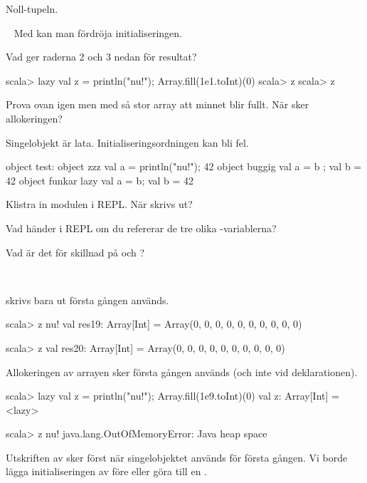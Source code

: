 \SubtaskSolved Noll-tupeln.

\QUESTEND



\QUESTBEGIN

\Task \what~ Med  kan man fördröja initialiseringen.

\Subtask Vad ger raderna 2 och 3 nedan för resultat?
\begin{REPL}
scala> lazy val z = { println("nu!"); Array.fill(1e1.toInt)(0)}
scala> z
scala> z
\end{REPL}

\Subtask Prova ovan igen men med så stor array att minnet blir fullt. När sker allokeringen?

\Subtask Singelobjekt är lata. Initialiseringsordningen kan bli fel.
\begin{Code}
object test:
  object zzz    { val a = { println("nu!"); 42} }
  object buggig { val a = b ; val b = 42        }
  object funkar { lazy val a = b; val b = 42    }
\end{Code}
\noindent Klistra in modulen  i REPL. När skrivs  ut?

\Subtask Vad händer i REPL om du refererar de tre olika -variablerna?

\Subtask Vad är det för skillnad på  och ?

\SOLUTION

\TaskSolved \what~

\SubtaskSolved {} skrivs bara ut första gången  används.
\begin{REPL}
scala> z
nu!
val res19: Array[Int] = Array(0, 0, 0, 0, 0, 0, 0, 0, 0, 0)

scala> z
val res20: Array[Int] = Array(0, 0, 0, 0, 0, 0, 0, 0, 0, 0)
\end{REPL}

\SubtaskSolved Allokeringen av arrayen sker första gången  används (och inte vid deklarationen).
\begin{REPL}
scala> lazy val z = { println("nu!"); Array.fill(1e9.toInt)(0)}
val z: Array[Int] = <lazy>

scala> z
nu!
java.lang.OutOfMemoryError: Java heap space
\end{REPL}

\SubtaskSolved Utskriften av  sker först när singelobjektet  används för första gången. Vi borde lägga initialiseringen av  före  eller göra  till en .

